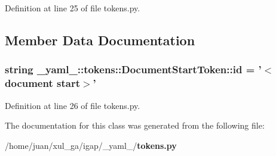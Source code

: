 Definition at line 25 of file tokens.py.

\subsection{Member Data Documentation}
\subsubsection{\setlength{\rightskip}{0pt plus 5cm}string {\bf \_\-yaml\_\-::tokens::DocumentStartToken::id} = '$<$document start$>$'\hspace{0.3cm}{\tt  [static]}}\label{class__yaml___1_1tokens_1_1DocumentStartToken_5d494b7d7b1b4303ed82dc470c811209}




Definition at line 26 of file tokens.py.

The documentation for this class was generated from the following file:\begin{CompactItemize}
\item 
/home/juan/xul\_\-ga/igap/\_\-yaml\_\-/{\bf tokens.py}\end{CompactItemize}
